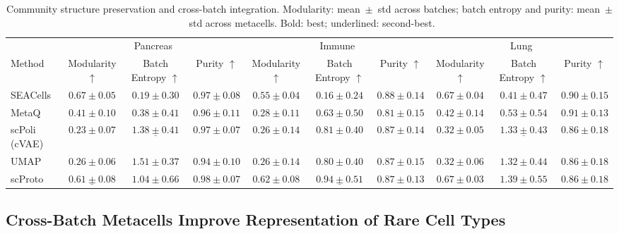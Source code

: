 \begin{table}[t]
\centering
\caption{Community structure preservation and cross-batch integration. Modularity: mean~$\pm$~std across batches; batch entropy and purity: mean~$\pm$~std across metacells. Bold: best; underlined: second-best.}
\label{tab:graph_batch}
\tiny
\setlength{\tabcolsep}{1pt}
\begin{tabular}{lccc|ccc|ccc}
\toprule
 & \multicolumn{3}{c}{Pancreas}
 & \multicolumn{3}{c}{Immune}
 & \multicolumn{3}{c}{Lung} \\
\cmidrule(lr){2-4} \cmidrule(lr){5-7} \cmidrule(lr){8-10}
Method
& Modularity $\uparrow$ & Batch Entropy $\uparrow$ & Purity $\uparrow$
& Modularity $\uparrow$ & Batch Entropy $\uparrow$ & Purity $\uparrow$
& Modularity $\uparrow$ & Batch Entropy $\uparrow$ & Purity $\uparrow$ \\
\midrule

SEACells
& $\mathbf{0.67 \pm 0.05}$ & $0.19 \pm 0.30$ & $\underline{0.97 \pm 0.08}$
& $\underline{0.55 \pm 0.04}$ & $0.16 \pm 0.24$ & $\mathbf{0.88 \pm 0.14}$
& $\mathbf{0.67 \pm 0.04}$ & $0.41 \pm 0.47$ & $\mathbf{0.90 \pm 0.15}$ \\

MetaQ
& $0.41 \pm 0.10$ & $0.38 \pm 0.41$ & $0.96 \pm 0.11$
& $0.28 \pm 0.11$ & $0.63 \pm 0.50$ & $0.81 \pm 0.15$
& $0.42 \pm 0.14$ & $0.53 \pm 0.54$ & $0.91 \pm 0.13$ \\

scPoli (cVAE)
& $0.23 \pm 0.07$ & $\underline{1.38 \pm 0.41}$ & $0.97 \pm 0.07$
& $0.26 \pm 0.14$ & $0.81 \pm 0.40$ & $0.87 \pm 0.14$
& $0.32 \pm 0.05$ & $\underline{1.33 \pm 0.43}$ & $0.86 \pm 0.18$ \\

UMAP
& $0.26 \pm 0.06$ & $\mathbf{1.51 \pm 0.37}$ & $0.94 \pm 0.10$
& $0.26 \pm 0.14$ & $0.80 \pm 0.40$ & $0.87 \pm 0.15$
& $0.32 \pm 0.06$ & $1.32 \pm 0.44$ & $0.86 \pm 0.18$ \\

\midrule

scProto
& $\underline{0.61 \pm 0.08}$ & $1.04 \pm 0.66$ & $\mathbf{0.98 \pm 0.07}$
& $\mathbf{0.62 \pm 0.08}$ & $\underline{0.94 \pm 0.51}$ & $0.87 \pm 0.13$
& $\mathbf{0.67 \pm 0.03}$ & $\mathbf{1.39 \pm 0.55}$ & $0.86 \pm 0.18$ \\

\bottomrule
\end{tabular}
\setlength{\tabcolsep}{6pt}
\end{table}

\subsection{Cross-Batch Metacells Improve Representation of Rare Cell Types}

